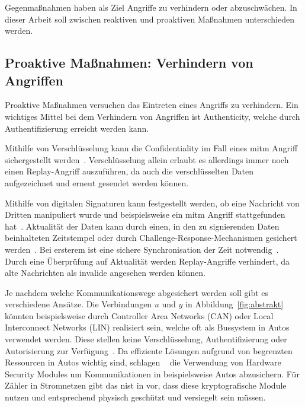 \documentclass[final,bibliography=totocnumbered]{include/sikseminar}
\begin{document}
    Gegenmaßnahmen haben als Ziel Angriffe zu verhindern oder abzuschwächen.
    In dieser Arbeit soll zwischen reaktiven und proaktiven Maßnahmen unterschieden werden.

    \subsection{Proaktive Maßnahmen: Verhindern von Angriffen}
    \label{subsec:proactive}
    Proaktive Maßnahmen versuchen das Eintreten eines Angriffs zu verhindern.
    Ein wichtiges Mittel bei dem Verhindern von Angriffen ist Authenticity, welche durch Authentifizierung erreicht werden kann.

    Mithilfe von Verschlüsselung kann die Confidentiality im Fall eines \gls{mitm} Angriff sichergestellt werden~\cite{HLL+17}.
    Verschlüsselung allein erlaubt es allerdings immer noch einen Replay-Angriff auszuführen, da auch die verschlüsselten Daten aufgezeichnet und erneut gesendet werden können.

    Mithilfe von digitalen Signaturen kann festgestellt werden, ob eine Nachricht von Dritten manipuliert wurde und beispielsweise ein \gls{mitm} Angriff stattgefunden hat~\cite{CAS08}.
    Aktualität der Daten kann durch einen, in den zu signierenden Daten beinhalteten Zeitstempel oder durch Challenge-Response-Mechanismen gesichert werden~\cite{CAS08}.
    Bei ersterem ist eine sichere Synchronisation der Zeit notwendig~\cite{CAS08}.
    Durch eine Überprüfung auf Aktualität werden Replay-Angriffe verhindert, da alte Nachrichten als invalide angesehen werden können.


    Je nachdem welche Kommunikationswege abgesichert werden soll gibt es verschiedene Ansätze.
    Die Verbindungen $u$ und $y$ in Abbildung~\ref{fig:abstrakt} könnten beispielsweise durch Controller Area Networks (CAN) oder Local Interconnect Networks (LIN) realisiert sein, welche oft als Bussystem in Autos verwendet werden.
    Diese stellen keine Verschlüsselung, Authentifizierung oder Autorisierung zur Verfügung~\cite{HLL+17}.
    Da effiziente Lösungen aufgrund von begrenzten Ressourcen in Autos wichtig sind, schlagen \citeauthor{WG12}~\cite{WG12} die Verwendung von Hardware Security Modules um Kommunikationen in beispielsweise Autos abzusichern.
    Für Zähler in Stromnetzen gibt das \gls{nist} in \cite{PB14} vor, dass diese kryptografische Module nutzen und entsprechend physisch geschützt und versiegelt sein müssen.
\end{document}

